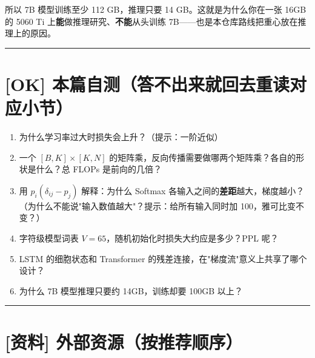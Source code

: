 所以 7B 模型训练至少 112 GB，推理只要 14 GB。这就是为什么你在一张 16GB 的 5060 Ti 上\textbf{能}做推理研究、\textbf{不能}从头训练 7B——也是本仓库路线把重心放在推理上的原因。

\vspace{0.8em}\hrule\vspace{0.8em}

\section{[OK] 本篇自测（答不出来就回去重读对应小节）}

\begin{enumerate}
  \item 为什么学习率过大时损失会上升？（提示：一阶近似）
  \item 一个 $[B, K] \times [K, N]$ 的矩阵乘，反向传播需要做哪两个矩阵乘？各自的形状是什么？总 FLOPs 是前向的几倍？
  \item 用 $p_i(\delta_{ij} - p_j)$ 解释：为什么 Softmax 各输入之间的\textbf{差距}越大，梯度越小？（为什么不能说"输入数值越大"？提示：给所有输入同时加 100，雅可比变不变？）
  \item 字符级模型词表 $V = 65$，随机初始化时损失大约应是多少？PPL 呢？
  \item LSTM 的细胞状态和 Transformer 的残差连接，在"梯度流"意义上共享了哪个设计？
  \item 为什么 7B 模型推理只要约 14GB，训练却要 100GB 以上？
\end{enumerate}

\vspace{0.8em}\hrule\vspace{0.8em}

\section{[资料] 外部资源（按推荐顺序）}

